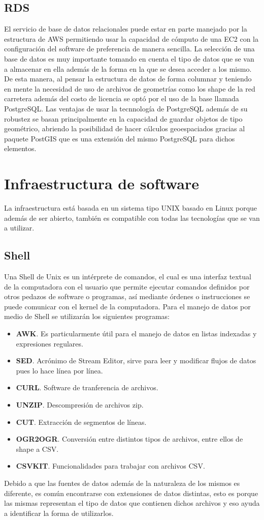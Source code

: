 \subsection{RDS}
El servicio de base de datos relacionales puede estar en parte manejado por la estructura de AWS permitiendo usar la capacidad de cómputo de una EC2 con la configuración del software de preferencia de manera sencilla. La selección de una base de datos es muy importante tomando en cuenta el tipo de datos que se van a almacenar en ella además de la forma en la que se desea acceder a los mismo. De esta manera, al pensar la estructura de datos de forma columnar y teniendo en mente la necesidad de uso de archivos de geometrías como los shape de la red carretera además del costo de licencia se optó por el uso de la base llamada PostgreSQL. Las ventajas de usar la tecnnología de PostgreSQL además de su robustez se basan principalmente en la capacidad de guardar objetos de tipo geométrico, abriendo la posibilidad de hacer cálculos geoespaciados gracias al paquete PostGIS que es una extensión del mismo PostgreSQL para dichos elementos.

\section{Infraestructura de software}
La infraestructura está basada en un sistema tipo UNIX basado en Linux porque además de ser abierto, también es compatible con todas las tecnologías que se van a utilizar.\\
\subsection{Shell}
Una Shell de Unix es un intérprete de comandos, el cual es una interfaz textual de la computadora con el usuario que permite ejecutar comandos definidos por otros pedazos de software o programas, así mediante órdenes o instrucciones se puede comunicar con el kernel de la computadora. Para el manejo de datos por medio de Shell se utilizarán los siguientes programas:
\begin{itemize}
    \item \textbf{AWK}. Es particularmente útil para el manejo de datos en listas indexadas y expresiones regulares.
    \item \textbf{SED}. Acrónimo de Stream Editor, sirve para leer y modificar flujos de datos pues lo hace línea por línea.
    \item \textbf{CURL}. Software de tranferencia de archivos.
    \item \textbf{UNZIP}. Descompresión de archivos zip.
    \item \textbf{CUT}. Extracción de segmentos de líneas.
    \item \textbf{OGR2OGR}. Conversión entre distintos tipos de archivos, entre ellos de shape a CSV.
    \item \textbf{CSVKIT}. Funcionalidades para trabajar con archivos CSV.
\end{itemize}
Debido a que las fuentes de datos además de la naturaleza de los mismos es diferente, es común encontrarse con extensiones de datos distintas, esto es porque las mismas representan el tipo de  datos que contienen dichos archivos y eso ayuda a identificar la forma de utilizarlos.
